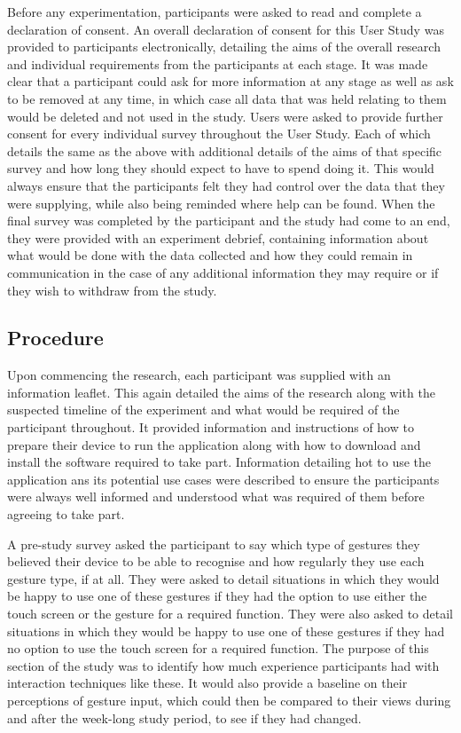 \documentclass{l4proj}
\begin{document}
Before any experimentation, participants were asked to read and complete a declaration of consent. An overall declaration of consent for this User Study was provided to participants electronically, detailing the aims of the overall research and individual requirements from the participants at each stage. It was made clear that a participant could ask for more information at any stage as well as ask to be removed at any time, in which case all data that was held relating to them would be deleted and not used in the study. Users were asked to provide further consent for every individual survey throughout the User Study. Each of which details the same as the above with additional details of the aims of that specific survey and how long they should expect to have to spend doing it. This would always ensure that the participants felt they had control over the data that they were supplying, while also being reminded where help can be found. When the final survey was completed by the participant and the study had come to an end, they were provided with an experiment debrief, containing information about what would be done with the data collected and how they could remain in communication in the case of any additional information they may require or if they wish to withdraw from the study.

\subsection{Procedure}

Upon commencing the research, each participant was supplied with an information leaflet. This again detailed the aims of the research along with the suspected timeline of the experiment and what would be required of the participant throughout. It provided information and instructions of how to prepare their device to run the application along with how to download and install the software required to take part. Information detailing hot to use the application ans its potential use cases were described to ensure the participants were always well informed and understood what was required of them before agreeing to take part.

A pre-study survey asked the participant to say which type of gestures they believed their device to be able to recognise and how regularly they use each gesture type, if at all. They were asked to detail situations in which they would be happy to use one of these gestures if they had the option to use either the touch screen or the gesture for a required function. They were also asked to detail situations in which they would be happy to use one of these gestures if they had no option to use the touch screen for a required function. The purpose of this section of the study was to identify how much experience participants had with interaction techniques like these. It would also provide a baseline on their perceptions of gesture input, which could then be compared to their views during and after the week-long study period, to see if they had changed.
\end{document}
